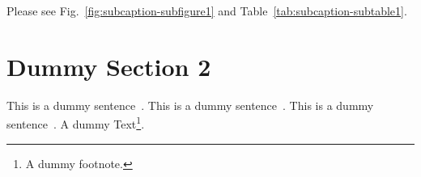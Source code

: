 \documentclass[twocolumn]{article}
\begin{document}
Please see Fig.~\ref{fig:subcaption-subfigure1} and Table~\ref{tab:subcaption-subtable1}.
 \section{Dummy Section 2}
\label{sec:dummy2}

This is a dummy sentence~\cite{Alpher02}. This is a dummy sentence~\cite{Alpher03}. This is a dummy sentence~\cite{Alpher04}. A dummy Text\footnote{A dummy footnote.}.



\end{document}
